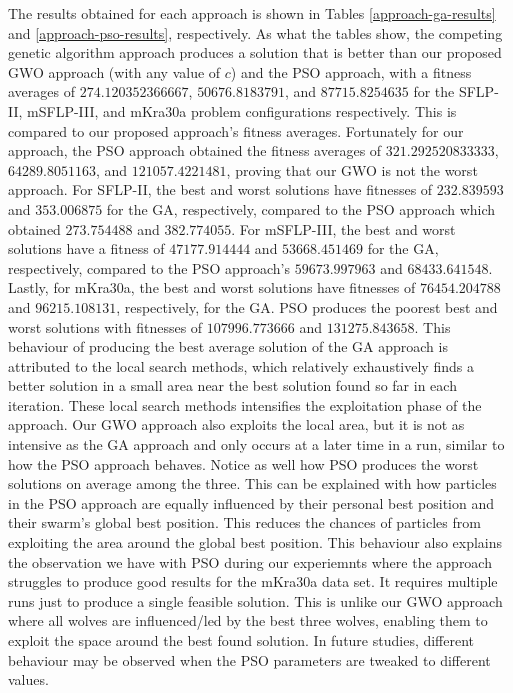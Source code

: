 The results obtained for each approach is shown in Tables \ref{approach-ga-results} and \ref{approach-pso-results}, respectively. As what the tables show, the competing genetic algorithm approach produces a solution that is better than our proposed GWO approach (with any value of $c$) and the PSO approach, with a fitness averages of $274.120352366667$, $50676.8183791$, and $87715.8254635$ for the SFLP-II, mSFLP-III, and mKra30a problem configurations respectively. This is compared to our proposed approach's fitness averages. Fortunately for our approach, the PSO approach obtained the fitness averages of $321.292520833333$, $64289.8051163$, and $121057.4221481$, proving that our GWO is not the worst approach. For SFLP-II, the best and worst solutions have fitnesses of $232.839593$ and $353.006875$ for the GA, respectively, compared to the PSO approach which obtained $273.754488$ and $382.774055$. For mSFLP-III, the best and worst solutions have a fitness of $47177.914444$ and $53668.451469$ for the GA, respectively, compared to the PSO approach's $59673.997963$ and $68433.641548$. Lastly, for mKra30a, the best and worst solutions have fitnesses of $76454.204788$ and $96215.108131$, respectively, for the GA. PSO produces the poorest best and worst solutions with fitnesses of $107996.773666$ and $131275.843658$. This behaviour of producing the best average solution of the GA approach is attributed to the local search methods, which relatively exhaustively finds a better solution in a small area near the best solution found so far in each iteration. These local search methods intensifies the exploitation phase of the approach. Our GWO approach also exploits the local area, but it is not as intensive as the GA approach and only occurs at a later time in a run, similar to how the PSO approach behaves. Notice as well how PSO produces the worst solutions on average among the three. This can be explained with how particles in the PSO approach are equally influenced by their personal best position and their swarm's global best position. This reduces the chances of particles from exploiting the area around the global best position. This behaviour also explains the observation we have with PSO during our experiemnts where the approach struggles to produce good results for the mKra30a data set. It requires multiple runs just to produce a single feasible solution. This is unlike our GWO approach where all wolves are influenced/led by the best three wolves, enabling them to exploit the space around the best found solution. In future studies, different behaviour may be observed when the PSO parameters are tweaked to different values.


